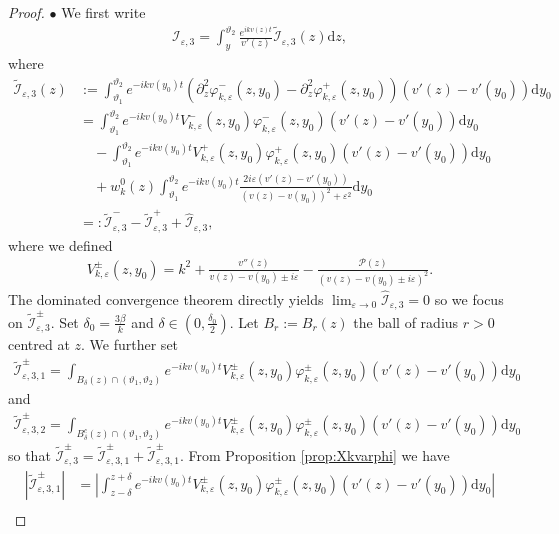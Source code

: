 \documentclass[11pt,reqno]{amsproc}
\newcommand{\bullpar}[1]{\vspace{.5em}\noindent $\bullet$ \normalfont {\bfseries #1.}}
\theoremstyle{definition}
\numberwithin{equation}{section}
\newcommand{\cI}{{\mathcal I}}
\renewcommand{\d}{\mathrm{d}}
\newcommand{\ep}{\varepsilon}
\renewcommand{\P}{{\mathcal{P}}}
\begin{document}
\begin{proof}
\bullpar{Estimates for $\cI_{\ep,3}$} 
We first write
\begin{align*}
\cI_{\ep,3} = \int_y^{\vartheta_2} \frac{e^{ikv(z) t}}{v'(z)}  \widetilde\cI_{\ep,3}(z) \d z,
\end{align*}
where
\begin{align*}
\widetilde\cI_{\ep,3}(z) &:= \int_{\vartheta_1}^{\vartheta_2} e^{-ikv(y_0)t}\left( \partial_z^2\varphi_{k,\ep}^-(z,y_0) - \partial_z^2\varphi_{k,\ep}^+(z,y_0) \right) (v'(z) - v'(y_0))\d y_0 \\
&= \int_{\vartheta_1}^{\vartheta_2} e^{-ikv(y_0)t} V_{k,\ep}^-(z,y_0)\varphi_{k,\ep}^-(z,y_0)(v'(z) - v'(y_0)) \d y_0 \\
& \quad - \int_{\vartheta_1}^{\vartheta_2} e^{-ikv(y_0)t} V_{k,\ep}^+(z,y_0) \varphi_{k,\ep}^+(z,y_0)(v'(z) - v'(y_0)) \d y_0 \\
& \quad+ w_k^0(z)\int_{\vartheta_1}^{\vartheta_2}e^{-ikv(y_0)t}\frac{2i\ep(v'(z) - v'(y_0))}{(v(z) - v(y_0))^2 + \ep^2} \d y_0 \\
&=:\widetilde\cI_{\ep,3}^- - \widetilde\cI_{\ep,3}^+ + \widehat{\cI}_{\ep,3},
\end{align*}
where we defined
\begin{align*}
V_{k,\ep}^\pm(z,y_0) = k^2 + \frac{v''(z)}{v(z) - v(y_0) \pm i\ep} - \frac{\P(z)}{(v(z) - v(y_0) \pm i\ep)^2} .
\end{align*}
The dominated convergence theorem directly yields $\lim_{\ep\rightarrow 0} \widehat{\cI}_{\ep,3}=0$ so we focus on $\widetilde\cI_{\ep,3}^\pm$. Set $\delta_0 =\frac{3\beta}{k}$ and $\delta\in (0,\frac{\delta_0}{2})$. Let $B_r:=B_r(z)$ the ball of radius $r>0$ centred at $z$. We further set
\begin{align*}
\widetilde\cI_{\ep,3,1}^\pm = \int_{B_\delta(z)\cap(\vartheta_1,\vartheta_2)}e^{-ikv(y_0)t}V_{k,\ep}^\pm(z,y_0)\varphi_{k,\ep}^\pm(z,y_0) (v'(z) - v'(y_0)) \d y_0
\end{align*}
and
\begin{align*}
\widetilde\cI_{\ep,3,2}^\pm = \int_{B_\delta^c(z)\cap(\vartheta_1,\vartheta_2)}e^{-ikv(y_0)t}V_{k,\ep}^\pm(z,y_0)\varphi_{k,\ep}^\pm(z,y_0) (v'(z) - v'(y_0)) \d y_0
\end{align*}
so that $\widetilde\cI_{\ep,3}^\pm = \widetilde\cI_{\ep,3,1}^\pm + \widetilde\cI_{\ep,3,1}^\pm$. From Proposition \ref{prop:Xkvarphi} we have
\begin{align*}
|\widetilde\cI_{\ep,3,1}^\pm| & = \left|  \int_{z-\delta}^{z+\delta} e^{-ikv(y_0)t} V_{k,\ep}^\pm(z,y_0) \varphi_{k,\ep}^\pm(z,y_0)(v'(z) - v'(y_0)) \d y_0 \right| \\

\end{align*}
\end{proof}
\end{document}
